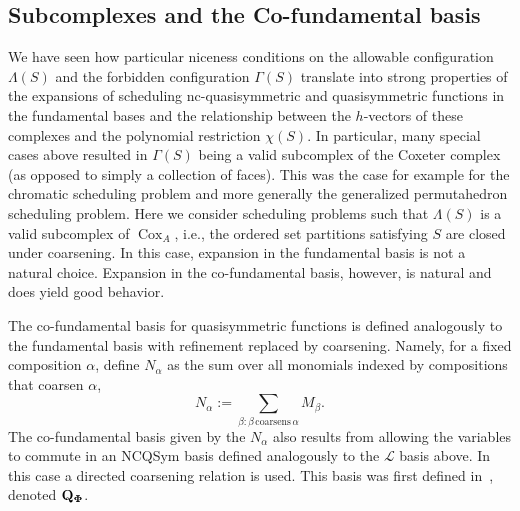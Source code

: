 \documentclass[12pt,reqno]{amsart}
\numberwithin{definition}{section}
\theoremstyle{definition}
\newcommand{\cox}{\operatorname{Cox}}
\newcommand{\ncM}{\mathcal{M}}
\newcommand{\ncN}{\mathcal{N}}
\newcommand{\allow}{\Lambda} %
\newcommand{\poly}{\chi} %
\newcommand{\forb}{\Gamma} %
\begin{document}
\subsection{Subcomplexes and the Co-fundamental basis}
\label{sec:cofundamental}


We have seen how particular niceness conditions on the allowable
configuration $\allow(S)$ and the forbidden configuration $\forb(S)$
translate into strong properties of the expansions of scheduling nc-quasisymmetric and quasisymmetric functions  in the fundamental bases and the relationship between the
$h$-vectors of these complexes and the polynomial restriction
$\poly(S)$. 
 In particular, many special cases above resulted in
$\forb(S)$ being a valid subcomplex of the Coxeter complex (as
opposed to simply a collection of faces). This was the case for example for the chromatic scheduling problem and more generally the generalized permutahedron scheduling problem. 
 Here we consider scheduling problems such that $\allow(S)$ is a valid
 subcomplex of $\cox_A$, i.e., the ordered set partitions satisfying
 $S$ are closed under coarsening.  In this case, expansion in the
 fundamental basis is not a natural choice.  Expansion in the
 co-fundamental basis, however, is natural and does yield good
 behavior. 

 The co-fundamental basis for quasisymmetric functions is
 defined analogously to the fundamental basis with refinement replaced by coarsening.  Namely, for a fixed composition $\alpha$, define $N_{\alpha}$ as the sum over all monomials indexed by compositions that coarsen $\alpha$,
$$N_{\alpha} := \sum_{\beta : \beta \, \textrm{coarsens} \, \alpha} M_{\beta}.$$
The co-fundamental basis given by the $N_{\alpha}$ also results from allowing the variables to commute in an NCQSym basis defined analogously to the $\mathcal{L}$ basis above.  In this case a directed coarsening relation is used.  This basis was first defined in~\cite{Zab}, denoted  ${\bf {Q}_{\Phi}}$.




\end{document}
